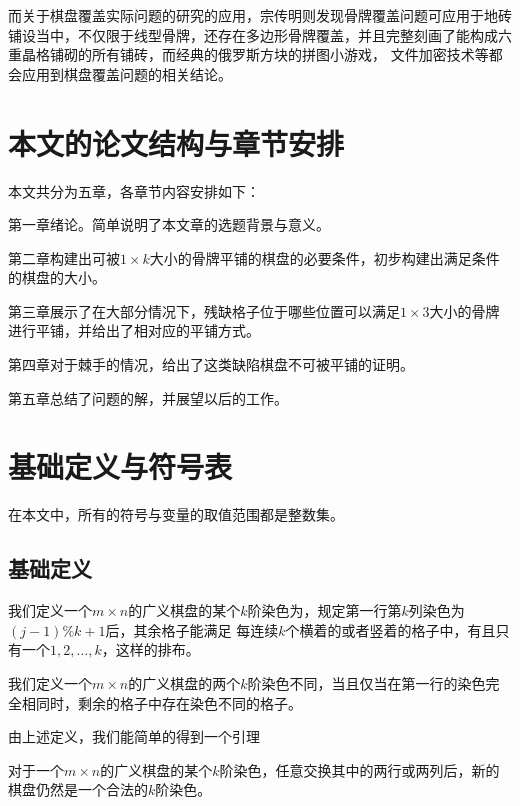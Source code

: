 而关于棋盘覆盖实际问题的研究的应用，宗传明则发现骨牌覆盖问题可应用于地砖铺设当中，不仅限于线型骨牌，还存在多边形骨牌覆盖，并且完整刻画了能构成六重晶格铺砌的所有铺砖，而经典的俄罗斯方块的拼图小游戏，
文件加密技术等都会应用到棋盘覆盖问题的相关结论。
\section{本文的论文结构与章节安排}

\label{sec:arrangement}

本文共分为五章，各章节内容安排如下：

第一章绪论。简单说明了本文章的选题背景与意义。

第二章构建出可被$1 \times k$大小的骨牌平铺的棋盘的必要条件，初步构建出满足条件的棋盘的大小。

第三章展示了在大部分情况下，残缺格子位于哪些位置可以满足$1 \times 3$大小的骨牌进行平铺，并给出了相对应的平铺方式。

第四章对于棘手的情况，给出了这类缺陷棋盘不可被平铺的证明。

第五章总结了问题的解，并展望以后的工作。

\section{基础定义与符号表}

在本文中，所有的符号与变量的取值范围都是整数集。

\subsection{基础定义}

\begin{definition}
    我们定义一个$m \times n$的广义棋盘的某个$k$阶染色为，规定第一行第$k$列染色为$(j - 1) \% k + 1$后，其余格子能满足
    每连续$k$个横着的或者竖着的格子中，有且只有一个$1, 2, ... , k$，这样的排布。
\end{definition}

\begin{definition}
    我们定义一个$m \times n$的广义棋盘的两个$k$阶染色不同，当且仅当在第一行的染色完全相同时，剩余的格子中存在染色不同的格子。
\end{definition}

由上述定义，我们能简单的得到一个引理
\begin{lemma}
    对于一个$m \times n$的广义棋盘的某个$k$阶染色，任意交换其中的两行或两列后，新的棋盘仍然是一个合法的$k$阶染色。
\end{lemma}


